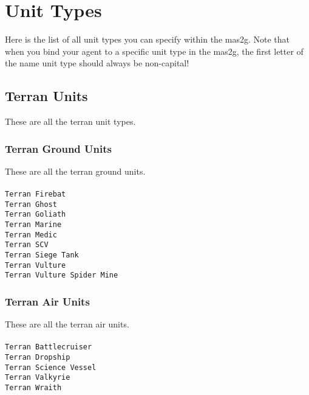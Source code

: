 \chapter{Unit Types}
\label{unittype}
Here is the list of all unit types you can specify within the mas2g. Note that when you bind your agent to a specific unit type in the mas2g, the first letter of the name unit type should always be non-capital!

\section{Terran Units}
These are all the terran unit types.

\subsection{Terran Ground Units}
These are all the terran ground units.
\\\\
\verb|Terran Firebat| \\
\verb|Terran Ghost| \\
\verb|Terran Goliath| \\
\verb|Terran Marine| \\
\verb|Terran Medic| \\
\verb|Terran SCV| \\
\verb|Terran Siege Tank| \\
\verb|Terran Vulture| \\
\verb|Terran Vulture Spider Mine| \\


\subsection{Terran Air Units}
These are all the terran air units.
\\\\
\verb|Terran Battlecruiser| \\
\verb|Terran Dropship| \\
\verb|Terran Science Vessel| \\
\verb|Terran Valkyrie| \\
\verb|Terran Wraith| \\

